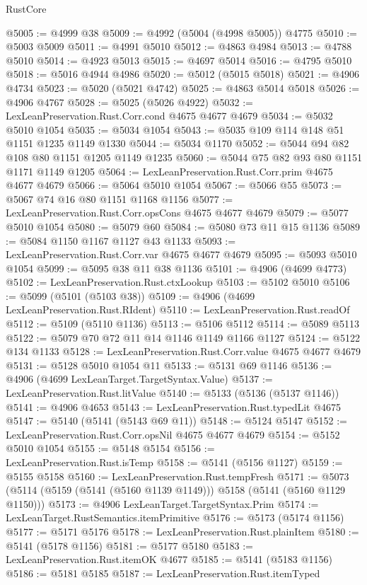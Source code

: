 \begin{lexlean}{RustCore}
\begin{coremodule}
@5005 := @4999 @38
@5009 := @4992 (@5004 (@4998 @5005)) @4775
@5010 := @5003 @5009
@5011 := @4991 @5010
@5012 := @4863 @4984
@5013 := @4788 @5010
@5014 := @4923 @5013
@5015 := @4697 @5014
@5016 := @4795 @5010
@5018 := @5016 @4944 @4986
@5020 := @5012 (@5015 @5018)
@5021 := @4906 @4734
@5023 := @5020 (@5021 @4742)
@5025 := @4863 @5014 @5018
@5026 := @4906 @4767
@5028 := @5025 (@5026 @4922)
@5032 := LexLeanPreservation.Rust.Corr.cond @4675 @4677 @4679
@5034 := @5032 @5010 @1054
@5035 := @5034 @1054
@5043 := @5035 @109 @114 @148 @51 @1151 @1235 @1149 @1330
@5044 := @5034 @1170
@5052 := @5044 @94 @82 @108 @80 @1151 @1205 @1149 @1235
@5060 := @5044 @75 @82 @93 @80 @1151 @1171 @1149 @1205
@5064 := LexLeanPreservation.Rust.Corr.prim @4675 @4677 @4679
@5066 := @5064 @5010 @1054
@5067 := @5066 @55
@5073 := @5067 @74 @16 @80 @1151 @1168 @1156
@5077 := LexLeanPreservation.Rust.Corr.opsCons @4675 @4677 @4679
@5079 := @5077 @5010 @1054
@5080 := @5079 @60
@5084 := @5080 @73 @11 @15 @1136
@5089 := @5084 @1150 @1167 @1127 @43 @1133
@5093 := LexLeanPreservation.Rust.Corr.var @4675 @4677 @4679
@5095 := @5093 @5010 @1054
@5099 := @5095 @38 @11 @38 @1136
@5101 := @4906 (@4699 @4773)
@5102 := LexLeanPreservation.Rust.ctxLookup
@5103 := @5102 @5010
@5106 := @5099 (@5101 (@5103 @38))
@5109 := @4906 (@4699 LexLeanPreservation.Rust.RIdent)
@5110 := LexLeanPreservation.Rust.readOf
@5112 := @5109 (@5110 @1136)
@5113 := @5106 @5112
@5114 := @5089 @5113
@5122 := @5079 @70 @72 @11 @14 @1146 @1149 @1166 @1127
@5124 := @5122 @134 @1133
@5128 := LexLeanPreservation.Rust.Corr.value @4675 @4677 @4679
@5131 := @5128 @5010 @1054 @11
@5133 := @5131 @69 @1146
@5136 := @4906 (@4699 LexLeanTarget.TargetSyntax.Value)
@5137 := LexLeanPreservation.Rust.litValue
@5140 := @5133 (@5136 (@5137 @1146))
@5141 := @4906 @4653
@5143 := LexLeanPreservation.Rust.typedLit @4675
@5147 := @5140 (@5141 (@5143 @69 @11))
@5148 := @5124 @5147
@5152 := LexLeanPreservation.Rust.Corr.opsNil @4675 @4677 @4679
@5154 := @5152 @5010 @1054
@5155 := @5148 @5154
@5156 := LexLeanPreservation.Rust.isTemp
@5158 := @5141 (@5156 @1127)
@5159 := @5155 @5158
@5160 := LexLeanPreservation.Rust.tempFresh
@5171 := @5073 (@5114 (@5159 (@5141 (@5160 @1139 @1149))) @5158 (@5141 (@5160 @1129 @1150)))
@5173 := @4906 LexLeanTarget.TargetSyntax.Prim
@5174 := LexLeanTarget.RustSemantics.itemPrimitive
@5176 := @5173 (@5174 @1156)
@5177 := @5171 @5176
@5178 := LexLeanPreservation.Rust.plainItem
@5180 := @5141 (@5178 @1156)
@5181 := @5177 @5180
@5183 := LexLeanPreservation.Rust.itemOK @4677
@5185 := @5141 (@5183 @1156)
@5186 := @5181 @5185
@5187 := LexLeanPreservation.Rust.itemTyped

\end{coremodule}
\end{lexlean}
